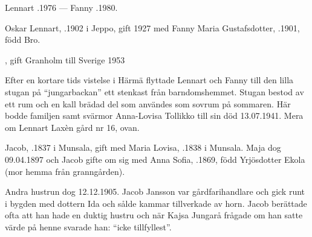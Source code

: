 Lennart .1976  ---  Fanny .1980.




%



%
Oskar Lennart, .1902 i Jeppo, gift 1927 med Fanny Maria Gustafsdotter, .1901, född Bro.
\begin{jhchildren}
  \item {}, gift Granholm till Sverige 1953
  \item {}
  \item {}
\end{jhchildren}

Efter en kortare tids vistelse i Härmä flyttade Lennart och Fanny till den lilla stugan på ``jungarbackan'' ett stenkast från barndomshemmet. Stugan bestod av ett rum och en kall brädad del som användes som sovrum på sommaren. Här bodde familjen samt svärmor Anna-Lovisa Tollikko till sin död 13.07.1941. Mera om Lennart Laxèn gård nr 16, ovan.


%
Jacob, .1837 i Munsala, gift med Maria Lovisa, .1838 i Munsala. Maja dog 09.04.1897 och Jacob gifte om sig med Anna Sofia, .1869, född Yrjösdotter Ekola (mor hemma från granngården).
\begin{jhchildren}
  \item {}
  \item {}
  \item {}
\end{jhchildren}
Andra hustrun dog 12.12.1905. Jacob Jansson var gårdfarihandlare och gick runt i bygden med dottern Ida och sålde kammar tillverkade av horn. Jacob berättade ofta att han hade en duktig hustru och när Kajsa Jungarå frågade om han satte värde på henne svarade han: ``icke tillfyllest''.

